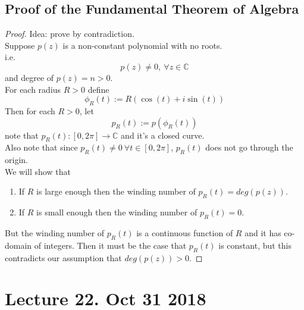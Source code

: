 \documentclass[10pt]{article}
\begin{document}
		\subsection{Proof of the Fundamental Theorem of Algebra}
		\begin{proof}
			Idea: prove by contradiction. \\
			Suppose $p(z)$ is a non-constant polynomial with no roots. \\
			i.e. 
			\[
				p(z) \neq 0,\ \forall z \in \mathbb{C}
			\]
			and degree of $p(z) = n > 0$. \\
			For each radius $R>0$ define 
			\[
				\phi_R(t) := R(\cos(t) + i \sin(t))
			\]
			Then for each $R>0$, let 
			\[
				p_R(t) := p(\phi_R(t))
			\]
			note that $p_R(t): [0, 2\pi] \to \mathbb{C}$ and it's a closed curve. \\
			Also note that since $p_R(t) \neq 0\ \forall t \in [0, 2\pi]$, $p_R(t)$ does not go through the origin. \\
			We will show that
			\begin{enumerate}
				\item If $R$ is large enough then the winding number of $p_R(t) = deg(p(z))$.
				\item If $R$ is small enough then the winding number of $p_R(t) = 0$.
			\end{enumerate}
			But the winding number of $p_R(t)$ is a continuous function of $R$ and it has co-domain of integers. Then it must be the case that $p_R(t)$ is constant, but this contradicts our assumption that $deg(p(z)) > 0$.
		\end{proof}
		
	\section{Lecture 22. Oct 31 2018}
\end{document}
